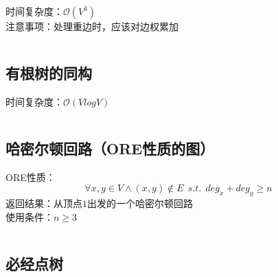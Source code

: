 \documentclass[a4paper]{article}
\newcommand{\cppcode}[1]{
    \inputminted[mathescape,
    frame=lines,linenos]{cpp}{source/#1}
}
\begin{document}
时间复杂度：$\mathcal{O}(V^3)$\\
\indent 注意事项：处理重边时，应该对边权累加

\cppcode{graph-theory/minimum-cut-stoer-wagner.cpp}


\subsection{有根树的同构}

时间复杂度：$\mathcal{O}(V log V)$

\cppcode{graph-theory/rooted-tree-isomorphism.cpp}





\subsection{哈密尔顿回路（ORE性质的图）}

ORE性质：$$\forall x,y \in V \wedge (x,y) \notin E \ \ s.t. \ \ deg_x+deg_y \geq n$$
\indent 返回结果：从顶点$1$出发的一个哈密尔顿回路\\
\indent 使用条件：$n \geq 3$

\cppcode{graph-theory/hamiltonian-circuit-ore.cpp}

\subsection{必经点树}
\cppcode{graph-theory/dominator-tree.cpp}
\end{document}
